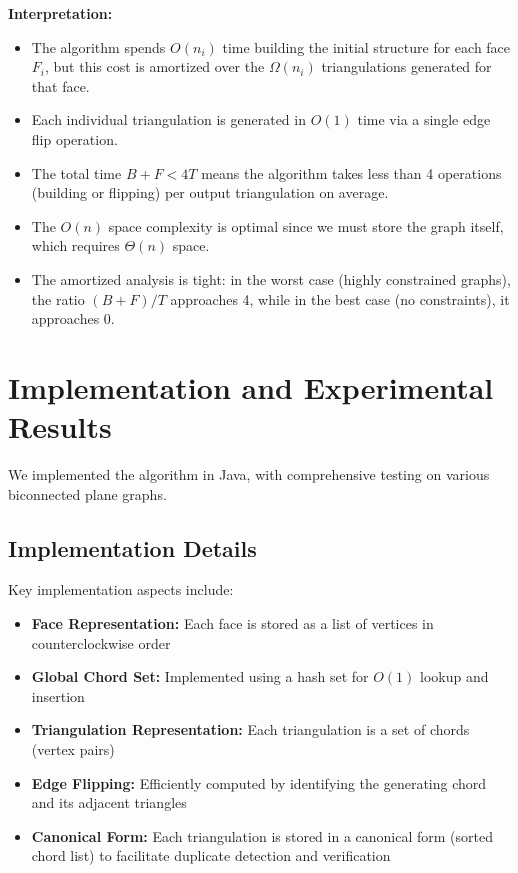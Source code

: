 \documentclass[12pt,a4paper]{article}
\theoremstyle{definition}
\theoremstyle{remark}
\begin{document}
\textbf{Interpretation:}

\begin{itemize}
\item The algorithm spends $O(n_i)$ time building the initial structure for each face $F_i$, but this cost is amortized over the $\Omega(n_i)$ triangulations generated for that face.

\item Each individual triangulation is generated in $O(1)$ time via a single edge flip operation.

\item The total time $B + F < 4T$ means the algorithm takes less than 4 operations (building or flipping) per output triangulation on average.

\item The $O(n)$ space complexity is optimal since we must store the graph itself, which requires $\Theta(n)$ space.

\item The amortized analysis is tight: in the worst case (highly constrained graphs), the ratio $(B+F)/T$ approaches 4, while in the best case (no constraints), it approaches 0.
\end{itemize}

\section{Implementation and Experimental Results}
\label{sec:implementation}

We implemented the algorithm in Java, with comprehensive testing on various biconnected plane graphs.

\subsection{Implementation Details}

Key implementation aspects include:
\begin{itemize}
    \item \textbf{Face Representation:} Each face is stored as a list of vertices in counterclockwise order
    \item \textbf{Global Chord Set:} Implemented using a hash set for $O(1)$ lookup and insertion
    \item \textbf{Triangulation Representation:} Each triangulation is a set of chords (vertex pairs)
    \item \textbf{Edge Flipping:} Efficiently computed by identifying the generating chord and its adjacent triangles
    \item \textbf{Canonical Form:} Each triangulation is stored in a canonical form (sorted chord list) to facilitate duplicate detection and verification
\end{itemize}
\end{document}
